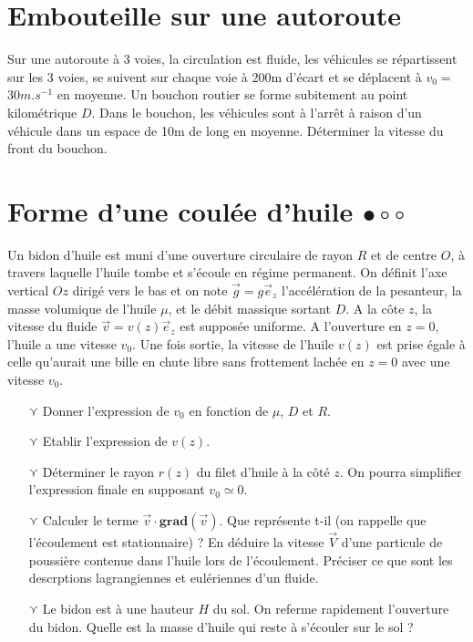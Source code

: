 \documentclass{report}
\begin{document}
\newpage

\section*{Embouteille sur une autoroute}

Sur une autoroute à 3 voies, la circulation est fluide, les véhicules se répartissent sur les 3 voies, se suivent sur chaque voie à 200m d'écart et se déplacent à $v_0=$30$m.s^{-1}$ en moyenne. Un bouchon routier se forme subitement au point kilométrique $D$. Dans le bouchon, les véhicules sont à l'arrêt à raison d'un véhicule dans un espace de 10m de long en moyenne. Déterminer la vitesse du front du bouchon.

\newpage

\section*{Forme d'une coulée d'huile $\bullet\circ\circ$}

Un bidon d'huile est muni d'une ouverture circulaire de rayon $R$ et de centre $O$, à travers laquelle l'huile tombe et s'écoule en régime permanent. On définit l'axe vertical $Oz$ dirigé vers le bas et on note $\vec{g}=g\vec{e}_z$ l'accélération de la pesanteur, la masse volumique de l'huile $\mu$, et le débit massique sortant $D$. A la côte $z$, la vitesse du fluide $\vec{v}=v(z)\vec{e}_z$ est supposée uniforme. A l'ouverture en $z=0$, l'huile a une vitesse $v_0$. Une fois sortie, la vitesse de l'huile $v(z)$ est prise égale à celle qu'aurait une bille en chute libre sans frottement lachée en $z=0$ avec une vitesse $v_0$. 

\begin{itemize}

	\item[$\curlyvee$] Donner l'expression de $v_0$ en fonction de $\mu$, $D$ et $R$.
	
	\item[$\curlyvee$] Etablir l'expression de $v(z)$.
	
	\item[$\curlyvee$] Déterminer le rayon $r(z)$ du filet d'huile à la côté $z$. On pourra simplifier l'expression finale en supposant $v_0\simeq0$.
	
	\item[$\curlyvee$] Calculer le terme $\vec{v}\cdot\mathbf{grad}(\vec{v})$. Que représente t-il (on rappelle que l'écoulement est stationnaire) ? En déduire la vitesse $\vec{V}$ d'une particule de poussière contenue dans l'huile lors de l'écoulement. Préciser ce que sont les descrptions lagrangiennes et eulériennes d'un fluide.
	
	\item[$\curlyvee$] Le bidon est à une hauteur $H$ du sol. On referme rapidement l'ouverture du bidon. Quelle est la masse d'huile qui reste à s'écouler sur le sol ?

\end{itemize}
\end{document}
